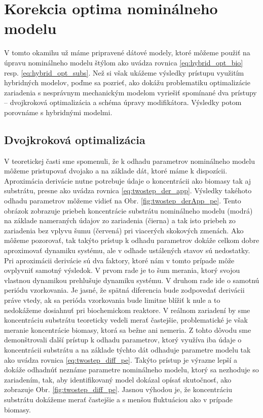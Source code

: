 \section{Korekcia optima nominálneho modelu}
V tomto okamihu už máme pripravené dátové modely, ktoré môžeme použiť na úpravu nominálneho modelu štýlom ako uvádza rovnica \ref{eq:hybrid_opt_bio} resp. \ref{eq:hybrid_opt_subs}. Než si však ukážeme výsledky prístupu využitím hybridných modelov, poďme sa pozrieť, ako dokážu problematiku optimalizácie zariadenia s nesprávnym mechanickým modelom vyriešiť spomínané dva prístupy -- dvojkroková optimalizácia a schéma úpravy modifikátora. Výsledky potom porovnáme s hybridnými modelmi. 

\subsection{Dvojkroková optimalizácia}
V teoretickej časti sme spomenuli, že k odhadu parametrov nominálneho modelu môžeme pristupovať dvojako a na základe dát, ktoré máme k dispozícii. Aproximácia derivácie nutne potrebuje údaje o koncentrácii ako biomasy tak aj substrátu, presne ako uvádza rovnica \eqref{eq:twostep_der_app}. Výsledky takéhoto odhadu parametrov môžeme vidieť na Obr. \ref{fig:twostep_derApp_pe}. Tento obrázok zobrazuje priebeh koncentrácie substrátu nominálneho modelu (modrá) na základe nameraných údajov zo zariadenia (čierna) a tak isto priebeh zo zariadenia bez vplyvu šumu (červená) pri viacerých skokových zmenách. Ako môžeme pozorovať, tak takýto prístup k odhadu parametrov dokáže celkom dobre aproximovať dynamiku systému, ale v odhade ustálených stavov sú nedostatky. Pri aproximácii derivácie sú dva faktory, ktoré nám v tomto prípade môže ovplyvniť samotný výsledok. V prvom rade je to šum merania, ktorý svojou vlastnou dynamikou prehlušuje dynamiku systému. V druhom rade ide o samotnú periódu vzorkovania. Je jasné, že spätná diferencia bude zodpovedať derivácii práve vtedy, ak sa perióda vzorkovania bude limitne blížiť k nule a to nedokážeme dosiahnuť pri biochemickom reaktore. V reálnom zariadení by sme koncentráciu substrátu teoreticky vedeli merať častejšie, problematické je však meranie koncentrácie biomasy, ktorá sa bežne ani nemeria. Z tohto dôvodu sme demonštrovali ďalší prístup k odhadu parametrov, ktorý využíva iba údaje o koncentrácii substrátu a na základe týchto dát odhaduje parametre modelu tak ako uvádza rovnica \eqref{eq:twostep_diff_pe}. Takýto prístup je výrazne lepší a dokáže  odhadnúť neznáme parametre nominálneho modelu, ktorý sa nezhoduje so zariadením, tak, aby identifikovaný model dokázal opísať skutočnosť, ako zobrazuje Obr. \ref{fig:twostep_diff_pe}. Jasnou výhodou je, že koncentráciu substrátu dokážeme merať častejšie a s menšou fluktuáciou ako v prípade biomasy. 
